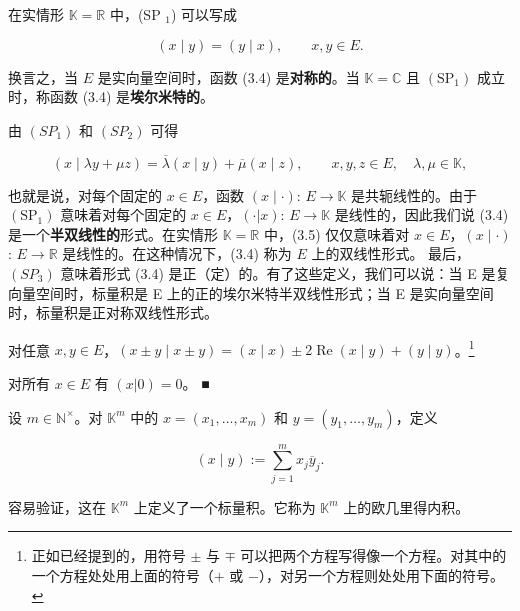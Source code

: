\begin{remark}

\begin{items}
\item

在实情形 $ \mathbb{K} = \mathbb{R} $ 中，(SP $ _{1} $) 可以写成

\[
(x\mid y)=(y\mid x),\qquad x,y\in E.
\]

换言之，当 $E$ 是实向量空间时，函数 (3.4) 是\textbf{对称的}。当 $\mathbb{K} = \mathbb{C}$ 且 $(\mathrm{SP}_1)$ 成立时，称函数 (3.4) 是\textbf{埃尔米特的}。

\item

由 $ (SP_{1}) $ 和 $ (SP_{2}) $ 可得

\begin{equation}
(x\mid\lambda y+\mu z)=\overline{\lambda}(x\mid y)+\overline{\mu}(x\mid z),\qquad x,y,z\in E,\quad\lambda,\mu\in\mathbb{K},
\end{equation}

也就是说，对每个固定的 $ x \in E $，函数 $ (x \mid \cdot) $: $ E \to \mathbb{K} $ 是共轭线性的。由于 $ (\mathrm{SP}_1) $ 意味着对每个固定的 $ x \in E $，$ (\cdot | x) $: $ E \to \mathbb{K} $ 是线性的，因此我们说 (3.4) 是一个\textbf{半双线性的}形式。在实情形 $ \mathbb{K} = \mathbb{R} $ 中，(3.5) 仅仅意味着对 $ x \in E $，$ (x \mid \cdot) $: $ E \to \mathbb{R} $ 是线性的。在这种情况下，(3.4) 称为 $ E $ 上的双线性形式。
最后，$ (SP_{3}) $ 意味着形式 (3.4) 是正（定）的。有了这些定义，我们可以说：当 E 是复向量空间时，标量积是 E 上的正的埃尔米特半双线性形式；当 E 是实向量空间时，标量积是正对称双线性形式。

\item

对任意 $x,y\in E$，$(x\pm y\mid x\pm y)=(x\mid x)\pm2\operatorname{Re}(x\mid y)+(y\mid y)$。\footnote{正如已经提到的，用符号 $\pm$ 与 $\mp$ 可以把两个方程写得像一个方程。对其中的一个方程处处用上面的符号（$+$ 或 $-$），对另一个方程则处处用下面的符号。}

\item

对所有 $ x \in E $ 有 $ (x|0) = 0 $。 ■

\end{items}

设 $ m \in \mathbb{N}^\times $。对 $ \mathbb{K}^m $ 中的 $ x = (x_1, \ldots, x_m) $ 和 $ y = (y_1, \ldots, y_m) $，定义

\[
(x\mid y):=\sum_{j=1}^{m}x_{j}\overline{y}_{j}.
\]

容易验证，这在 $ \mathbb{K}^m $ 上定义了一个标量积。它称为 $ \mathbb{K}^m $ 上的欧几里得内积。

\end{remark}

